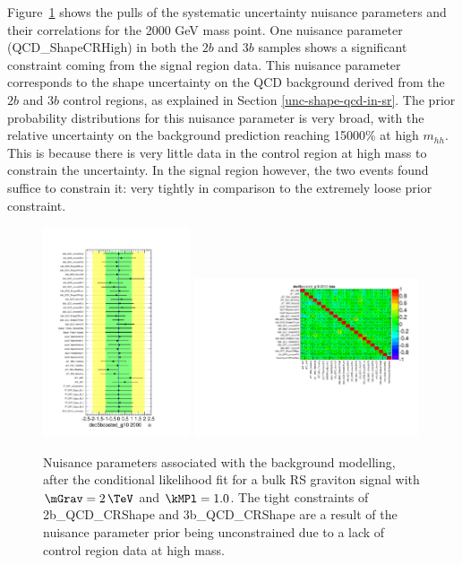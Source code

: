 Figure~\ref{fig:nuisanceParams} shows the pulls of the systematic uncertainty nuisance parameters and their correlations for the 2000 GeV mass point. One nuisance parameter (QCD\_ShapeCRHigh) in both the $2b$ and $3b$ samples shows a significant constraint coming from the signal region data. This nuisance parameter corresponds to the shape uncertainty on the QCD background derived from the $2b$ and $3b$ control regions, as explained in Section \ref{unc-shape-qcd-in-sr}. The prior probability distributions for this nuisance parameter is very broad, with the relative uncertainty on the background prediction reaching 15000\% at high $m_{hh}$. This is because there is very little data in the control region at high mass to constrain the uncertainty. In the signal region however, the two events found suffice to constrain it: very tightly in comparison to the extremely loose prior constraint.

\begin{figure}[htbp!]
\begin{center}
\includegraphics[width=0.39\textwidth,angle=-90]{figures/boosted/results/pulls_2000_data.pdf}
\includegraphics[width=0.59\textwidth,angle=-90]{figures/boosted/results/corr_2000_data.pdf}
\caption{Nuisance parameters associated with the background modelling, after the conditional likelihood fit for a bulk RS graviton signal with $\mGrav=2\,\TeV$ and $\kMPl=1.0$. The tight constraints of 2b\_QCD\_CRShape and 3b\_QCD\_CRShape are a result of the nuisance parameter prior being unconstrained due to a lack of control region data at high mass.}
\label{fig:nuisanceParams}
\end{center}
\end{figure}

